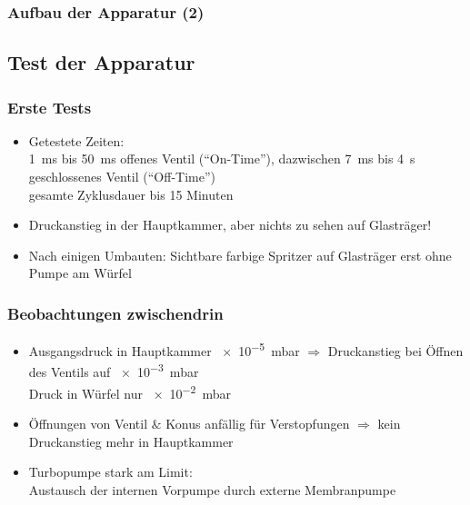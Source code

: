 \documentclass{beamer}
\begin{document}
\begin{frame}
\frametitle{Aufbau der Apparatur (2)}
\begin{figure}[H]
\centering

\end{figure}
\end{frame}



\subsection[Ergebnisse]{Test der Apparatur}

\begin{frame}
\frametitle{Erste Tests}
\begin{itemize}\setlength{\itemsep}{+15pt}
  \item Getestete Zeiten: \\
  \SI{1}{ms} bis \SI{50}{ms} offenes Ventil ("`On-Time"'), dazwischen \SI{7}{ms} bis \SI{4}{s} geschlossenes
  Ventil ("`Off-Time"')\\ 
  gesamte Zyklusdauer bis 15 Minuten
  \item Druckanstieg in der Hauptkammer, aber nichts zu sehen auf Glasträger!
  \item Nach einigen Umbauten: Sichtbare farbige Spritzer auf Glasträger erst ohne Pumpe am Würfel
\end{itemize}
\end{frame}


\begin{frame}
\frametitle{Beobachtungen zwischendrin}
\begin{itemize}\setlength{\itemsep}{+15pt}
  \item Ausgangsdruck in Hauptkammer \SI{e-5}{mbar} $\Rightarrow$ Druckanstieg bei Öffnen des
  Ventils auf \SI{e-3}{mbar}\\
  Druck in Würfel nur \SI{e-2}{mbar}
  \item Öffnungen von Ventil $\&$ Konus anfällig für Verstopfungen $\Rightarrow$ kein Druckanstieg
  mehr in Hauptkammer
  \item Turbopumpe stark am Limit:\\
  Austausch der internen Vorpumpe durch externe Membranpumpe
\end{itemize}
\end{frame}
\end{document}
